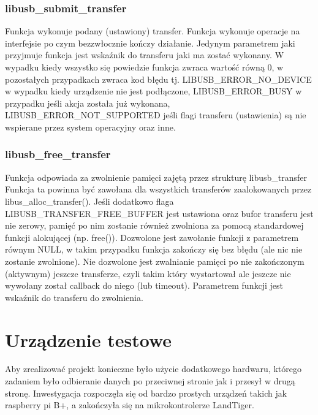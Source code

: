 \documentclass{BscUS}
\begin{document}
\subsection{libusb\_submit\_transfer}
Funkcja wykonuje podany (ustawiony) transfer.
\newline
Funkcja wykonuje operacje na interfejsie po czym bezzwłocznie kończy działanie.
\newline
Jedynym parametrem jaki przyjmuje funkcja jest wskaźnik do transferu jaki ma zostać wykonany.
\newline
W wypadku kiedy wszystko się powiedzie funkcja zwraca wartość równą 0, w pozostałych przypadkach zwraca kod błędu tj. LIBUSB\_ERROR\_NO\_DEVICE w wypadku kiedy urządzenie nie jest podłączone, LIBUSB\_ERROR\_BUSY w przypadku jeśli akcja została już wykonana, LIBUSB\_ERROR\_NOT\_SUPPORTED jeśli flagi transferu (ustawienia) są nie wspierane przez system operacyjny oraz inne.
\subsection{libusb\_free\_transfer}
Funkcja odpowiada za zwolnienie pamięci zajętą przez strukturę libusb\_transfer
\newline
Funkcja ta powinna być zawołana dla wszystkich transferów zaalokowanych przez libus\_alloc\_transfer().
\newline
Jeśli dodatkowo flaga LIBUSB\_TRANSFER\_FREE\_BUFFER jest ustawiona oraz bufor transferu jest nie zerowy, pamięć po nim zostanie również zwolniona za pomocą standardowej funkcji alokującej (np. free()).
\newline
Dozwolone jest zawołanie funkcji z parametrem równym NULL, w takim przypadku funkcja zakończy się bez błędu (ale nic nie zostanie zwolnione).
\newline
Nie dozwolone jest zwalnianie pamięci po nie zakończonym (aktywnym) jeszcze transferze, czyli takim który wystartował ale jeszcze nie wywołany został callback do niego (lub timeout).
\newline
Parametrem funkcji jest wskaźnik do transferu do zwolnienia.

\chapter{Urządzenie testowe}
\label{microcontrollerChapter}
Aby zrealizować projekt konieczne było użycie dodatkowego hardwaru, którego zadaniem było odbieranie danych po przeciwnej stronie jak i przesył w drugą stronę. Inwestygacja rozpoczęła się od bardzo prostych urządzeń takich jak raspberry pi B+, a zakończyła się na mikrokontrolerze LandTiger.
\end{document}
